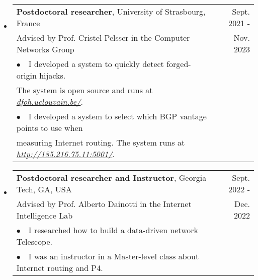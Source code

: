 \documentclass[letterpaper,11pt]{article}
\begin{document}
\begin{itemize}[label={},leftmargin=3mm]
\setlength\itemsep{1.5em}

\item

    \begin{tabular*}{6.5in}{l@{\cftdotfill{\cftsecdotsep}\extracolsep{\fill}}r}
    		\sffamily \textbf{Postdoctoral researcher}, University of Strasbourg, France & \sffamily Sept. 2021 -\\
    		\sffamily Advised by Prof. Cristel Pelsser in the Computer Networks Group & \sffamily Nov. 2023\\
			\sffamily $\bullet$~~I developed a system to quickly detect forged-origin hijacks. & \\
			\sffamily The system is open source and runs at \href{https://dfoh.uclouvain.be/}{\textit{dfoh.uclouvain.be/}}. & \\
			\sffamily $\bullet$~~I developed a system to select which BGP vantage points to use when & \\
			\sffamily  measuring Internet routing. The system runs at \href{http://185.216.75.11:5001/}{\textit{http://185.216.75.11:5001/}}. & \\

    \end{tabular*}\vspace{-10pt}

\item

    \begin{tabular*}{6.5in}{l@{\cftdotfill{\cftsecdotsep}\extracolsep{\fill}}r}
    		\sffamily \textbf{Postdoctoral researcher and Instructor}, Georgia Tech, GA, USA & \sffamily Sept. 2022 -\\
    		\sffamily Advised by Prof. Alberto Dainotti in the Internet Intelligence Lab & \sffamily Dec. 2022\\
			\sffamily $\bullet$~~I researched how to build a data-driven network Telescope. & \\
			\sffamily $\bullet$~~I was an instructor in a Master-level class about Internet routing and P4.  & \\

    \end{tabular*}\vspace{-10pt}


\end{itemize}
\end{document}
